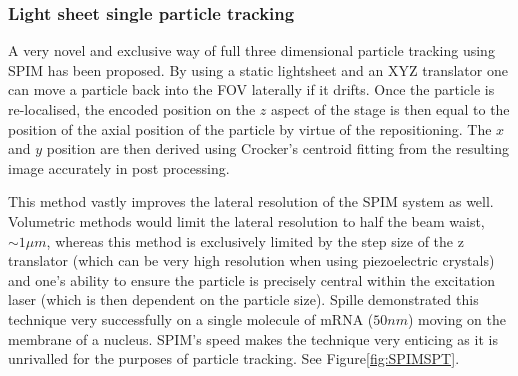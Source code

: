 





\subsubsection{Light sheet single particle tracking}

A very novel and exclusive way of full three dimensional particle tracking using SPIM has been proposed.
By using a static lightsheet and an XYZ translator one can move a particle back into the FOV laterally if it drifts.
Once the particle is re-localised, the encoded position on the \(z\) aspect of the stage is then equal to the position of the axial position of the particle by virtue of the repositioning.
The \(x\) and \(y\) position are then derived using Crocker's centroid fitting from the resulting image accurately in post processing.

This method vastly improves the lateral resolution of the SPIM system as well.
Volumetric methods would limit the lateral resolution to half the beam waist, \(\sim 1 \mu m\), whereas this method is exclusively limited by the step size of the z translator (which can be very high resolution when using piezoelectric crystals) and one's ability to ensure the particle is precisely central within the excitation laser (which is then dependent on the particle size).
Spille demonstrated this technique very successfully on a single molecule of mRNA (\(50 nm\)\cite{Spille2015a}) moving on the membrane of a nucleus\cite{Spille2015a}.
SPIM's speed makes the technique very enticing as it is unrivalled for the purposes of particle tracking.
See Figure\ref{fig:SPIMSPT}.

